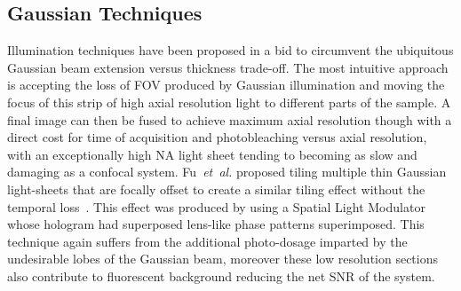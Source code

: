 \subsection{Gaussian Techniques}
Illumination techniques have been proposed in a bid to circumvent the ubiquitous Gaussian beam extension versus thickness trade-off.
The most intuitive approach is accepting the loss of FOV produced by Gaussian illumination and moving the focus of this strip of high axial resolution light to different parts of the sample.
A final image can then be fused to achieve maximum axial resolution though with a direct cost for time of acquisition and photobleaching versus axial resolution, with an exceptionally high NA light sheet tending to becoming as slow and damaging as a confocal system.
Fu~\emph{et~al.} proposed tiling multiple thin Gaussian light-sheets that are focally offset to create a similar tiling effect without the temporal loss~\cite{fu_imaging_2016}.
This effect was produced by using a Spatial Light Modulator whose hologram had superposed lens-like phase patterns superimposed.
This technique again suffers from the additional photo-dosage imparted by the undesirable lobes of the Gaussian beam, moreover these low resolution sections also contribute to fluorescent background reducing the net SNR of the system.
